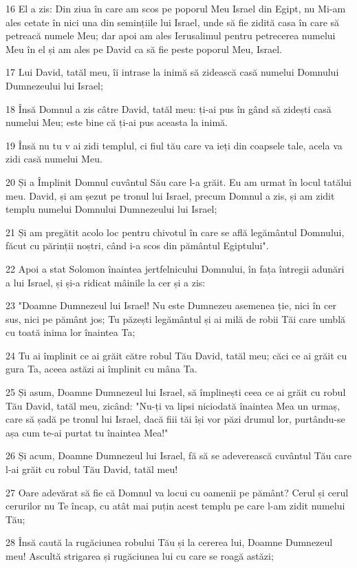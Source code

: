 \par 16 El a zis: Din ziua în care am scos pe poporul Meu Israel din Egipt, nu Mi-am ales cetate în nici una din semințiile lui Israel, unde să fie zidită casa în care să petreacă numele Meu; dar apoi am ales Ierusalimul pentru petrecerea numelui Meu în el și am ales pe David ca să fie peste poporul Meu, Israel.
\par 17 Lui David, tatăl meu, îi intrase la inimă să zidească casă numelui Domnului Dumnezeului lui Israel;
\par 18 Însă Domnul a zis câtre David, tatăl meu: ți-ai pus în gând să zidești casă numelui Meu; este bine că ți-ai pus aceasta la inimă.
\par 19 Însă nu tu v ai zidi templul, ci fiul tău care va ieți din coapsele tale, acela va zidi casă numelui Meu.
\par 20 Și a Împlinit Domnul cuvântul Său care l-a grăit. Eu am urmat în locul tatălui meu. David, și am șezut pe tronul lui Israel, precum Domnul a zis, și am zidit templu numelui Domnului Dumnezeului lui Israel;
\par 21 Și am pregătit acolo loc pentru chivotul în care se află legământul Domnului, făcut cu părinții noștri, când i-a scos din pământul Egiptului".
\par 22 Apoi a stat Solomon înaintea jertfelnicului Domnului, în fața întregii adunări a lui Israel, și și-a ridicat mâinile la cer și a zis:
\par 23 "Doamne Dumnezeul lui Israel! Nu este Dumnezeu asemenea ție, nici în cer sus, nici pe pământ jos; Tu păzești legământul și ai milă de robii Tăi care umblă cu toată inima lor înaintea Ta;
\par 24 Tu ai împlinit ce ai grăit către robul Tău David, tatăl meu; căci ce ai grăit cu gura Ta, aceea astăzi ai împlinit cu mâna Ta.
\par 25 Și asum, Doamne Dumnezeul lui Israel, să împlinești ceea ce ai grăit cu robul Tău David, tatăl meu, zicând: "Nu-ți va lipsi niciodată înaintea Mea un urmaș, care să șadă pe tronul lui Israel, dacă fiii tăi își vor păzi drumul lor, purtându-se așa cum te-ai purtat tu înaintea Mea!"
\par 26 Și acum, Doamne Dumnezeul lui Israel, fă să se adeverească cuvântul Tău care l-ai grăit cu robul Tău David, tatăl meu!
\par 27 Oare adevărat să fie că Domnul va locui cu oamenii pe pământ? Cerul și cerul cerurilor nu Te încap, cu atât mai puțin acest templu pe care l-am zidit numelui Tău;
\par 28 Însă caută la rugăciunea robului Tău și la cererea lui, Doamne Dumnezeul meu! Ascultă strigarea și rugăciunea lui cu care se roagă astăzi;
